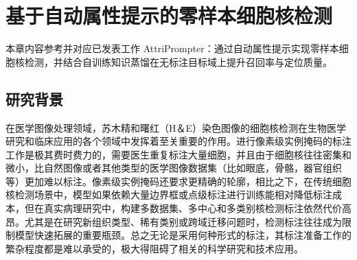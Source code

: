 \chapter{基于自动属性提示的零样本细胞核检测}

本章内容参考并对应已发表工作 AttriPrompter：通过自动属性提示实现零样本细胞核检测，并结合自训练知识蒸馏在无标注目标域上提升召回率与定位质量\cite{wu2024attriprompter}。

\section{研究背景}
在医学图像处理领域，苏木精和曙红（H＆E）染色图像的细胞核检测在生物医学研究和临床应用的各个领域中发挥着至关重要的作用\cite{gleason1992histologic}。进行像素级实例掩码的标注工作是极其费时费力的，需要医生重复标注大量细胞，并且由于细胞核往往密集和微小，比自然图像或者其他类型的医学图像数据集（比如眼底，骨骼，器官组织等）更加难以标注。像素级实例掩码还要求更精确的轮廓，相比之下，在传统细胞核检测场景中，模型如果依赖大量边界框或点级标注进行训练能相对降低标注成本，但在真实病理研究中，构建多数据集、多中心和多类别核检测标注依然代价高昂。尤其是在研究新组织类型、稀有类别或跨域迁移问题时，检测标注往往成为限制模型快速拓展的重要瓶颈。总之无论是采用何种形式的标注，其标注准备工作的繁杂程度都是难以承受的，极大得阻碍了相关的科学研究和技术应用。
